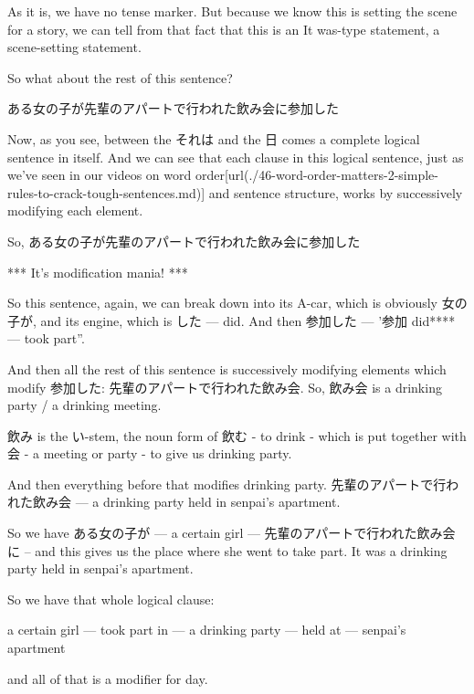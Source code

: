 As it is, we have no tense marker. But because we know this is setting the scene for a story, we can tell from that fact that this is an It was-type statement, a scene-setting statement.

So what about the rest of this sentence?

ある女の子が先輩のアパートで行われた飲み会に参加した

{}

Now, as you see, between the それは and the 日 comes a complete logical sentence in itself. And we can see that each clause in this logical sentence, just as we've seen in our videos on word order\goto{{[}46{]}}[url(./46-word-order-matters-2-simple-rules-to-crack-tough-sentences.md)] and sentence structure, works by successively modifying each element.

So, ある女の子が先輩のアパートで行われた飲み会に参加した

*** It's modification mania! ***

{}

So this sentence, again, we can break down into its A-car, which is obviously 女の子が, and its engine, which is した --- did. And then 参加した --- '参加 did**** --- took part”.

And then all the rest of this sentence is successively modifying elements which modify 参加した: 先輩のアパートで行われた飲み会. So, 飲み会 is a drinking party / a drinking meeting.

飲み is the い-stem, the noun form of 飲む - to drink - which is put together with 会 - a meeting or party - to give us drinking party.

{}

And then everything before that modifies drinking party. 先輩のアパートで行われた飲み会 --- a drinking party held in senpai's apartment.

{}

So we have ある女の子が --- a certain girl --- 先輩のアパートで行われた飲み会に -- and this gives us the place where she went to take part. It was a drinking party held in senpai's apartment.

So we have that whole logical clause:

a certain girl --- took part in --- a drinking party --- held at --- senpai's apartment

and all of that is a modifier for day.

